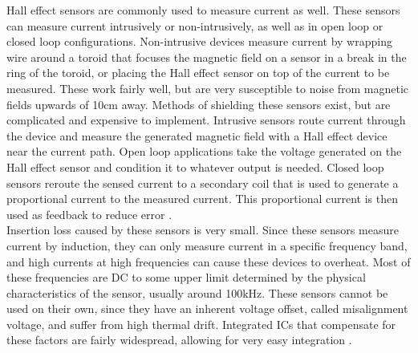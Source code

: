 \newline
Hall effect sensors are commonly used to measure current as well. These sensors can measure current intrusively or non-intrusively, as well as in open loop or closed loop configurations. Non-intrusive devices measure current by wrapping wire around a toroid that focuses the magnetic field on a sensor in a break in the ring of the toroid, or placing the Hall effect sensor on top of the current to be measured. These work fairly well, but are very susceptible to noise from magnetic fields upwards of 10cm away. Methods of shielding these sensors exist, but are complicated and expensive to implement. Intrusive sensors route current through the device and measure the generated magnetic field with a Hall effect device near the current path. Open loop applications take the voltage generated on the Hall effect sensor and condition it to whatever output is needed. Closed loop sensors reroute the sensed current to a secondary coil that is used to generate a proportional current to the measured current. This proportional current is then used as feedback to reduce error \cite{Current_Sensing}. \\
\newline
Insertion loss caused by these sensors is very small. Since these sensors measure current by induction, they can only measure current in a specific frequency band, and high currents at high frequencies can cause these devices to overheat. Most of these frequencies are DC to some upper limit determined by the physical characteristics of the sensor, usually around 100kHz. These sensors cannot be used on their own, since they have an inherent voltage offset, called misalignment voltage, and suffer from high thermal drift. Integrated ICs that compensate for these factors are fairly widespread, allowing for very easy integration \cite{Current_Sensing}.

